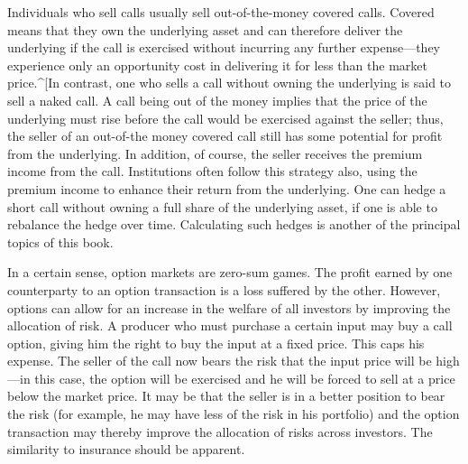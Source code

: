 Individuals who sell calls usually sell out-of-the-money covered calls.  Covered  means that they own the underlying asset and can therefore deliver the underlying if the call is exercised without incurring any further expense---they experience only an opportunity cost in delivering it for less than the market price.^[In contrast, one who sells a call without owning the underlying is said to sell a naked call.  \index{naked call] The seller of a naked call, or the seller of a put, must post margin, just like a short seller of stocks, in order to ensure that he can meet his obligation.  However, this does not apply to sellers of covered calls.}  A  call being out of the money implies that the price of the underlying must rise before the call would be exercised against the seller; thus, the seller of an out-of-the money covered call still has some potential for profit from the underlying.  In addition, of course, the seller receives the premium income from the call.  Institutions often follow this strategy also, using the premium income to enhance their return from the underlying.     One can hedge a short call without owning a full share of the underlying asset, if one is able to rebalance the hedge over time.  Calculating such hedges is another of the principal topics of this book.

In a certain sense, option markets are zero-sum games.  The profit earned by one counterparty to an option transaction is a loss suffered by the other.  However, options can allow for an increase in the welfare of all investors by improving the allocation of risk.  A producer who must purchase a certain input may buy a call option, giving him the right to buy the input at a fixed price.  This caps his expense.  The seller of the call now bears the risk that the input price will be high---in this case, the option will be exercised and he will be forced to sell at a price below the market price.  It may be that the seller is in a better position to bear the risk (for example, he may have less of the risk in his portfolio) and the option transaction may thereby improve the allocation of risks across investors.  The similarity to insurance should be apparent.

